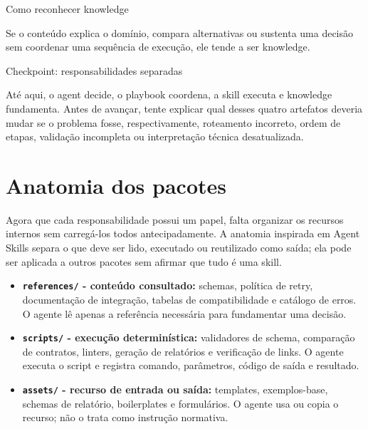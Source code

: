 \documentclass[
  10pt,
  a4paper,
  oneside]{book}
\providecommand{\tightlist}{%
  \setlength{\itemsep}{0pt}\setlength{\parskip}{0pt}}
\begin{document}
\begin{examplebox}{Como reconhecer knowledge}

Se o conteúdo explica o domínio, compara alternativas ou sustenta uma
decisão sem coordenar uma sequência de execução, ele tende a ser
knowledge.

\end{examplebox}

\begin{infobox}{Checkpoint: responsabilidades separadas}

Até aqui, o agent decide, o playbook coordena, a skill executa e
knowledge fundamenta. Antes de avançar, tente explicar qual desses
quatro artefatos deveria mudar se o problema fosse, respectivamente,
roteamento incorreto, ordem de etapas, validação incompleta ou
interpretação técnica desatualizada.

\end{infobox}

\hypertarget{anatomia-dos-pacotes}{%
\section{Anatomia dos pacotes}\label{anatomia-dos-pacotes}}

Agora que cada responsabilidade possui um papel, falta organizar os
recursos internos sem carregá-los todos antecipadamente. A anatomia
inspirada em Agent Skills separa o que deve ser lido, executado ou
reutilizado como saída; ela pode ser aplicada a outros pacotes sem
afirmar que tudo é uma skill.

\begin{itemize}
\tightlist
\item
  \textbf{\texttt{references/} - conteúdo consultado:} schemas, política
  de retry, documentação de integração, tabelas de compatibilidade e
  catálogo de erros. O agente lê apenas a referência necessária para
  fundamentar uma decisão.
\item
  \textbf{\texttt{scripts/} - execução determinística:} validadores de
  schema, comparação de contratos, linters, geração de relatórios e
  verificação de links. O agente executa o script e registra comando,
  parâmetros, código de saída e resultado.
\item
  \textbf{\texttt{assets/} - recurso de entrada ou saída:} templates,
  exemplos-base, schemas de relatório, boilerplates e formulários. O
  agente usa ou copia o recurso; não o trata como instrução normativa.
\end{itemize}
\end{document}
